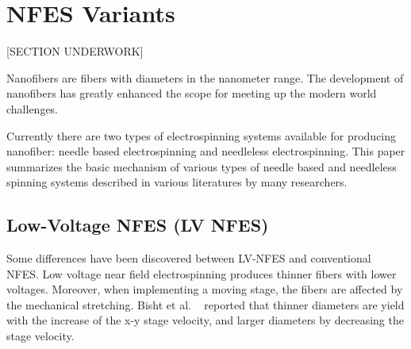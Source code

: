 \documentclass[5p,,preprint,12pt,twocolumn]{elsarticle}
\makeatletter
\def\fixFloatSize#1{}%
\makeatother
\begin{document}
\section{NFES Variants}
[SECTION UNDERWORK]

Nanofibers are fibers with diameters in the nanometer range. The development of nanofibers has greatly enhanced the scope for meeting up the modern world challenges. 

Currently there are two types of electrospinning systems available for producing nanofiber: needle based electrospinning and needleless electrospinning. This paper summarizes the basic mechanism of various types of needle based and needleless spinning systems described in various literatures by many researchers.


\bgroup
\fixFloatSize{images/69d16de4-c7d7-4000-b4c8-93a40c79692b-uelectrospinningvariants.jpg}
\begin{figure}[!htbp]
\centering \makeatletter{}
\makeatother 
\caption{{}}
\label{f-f076e2b74317}
\end{figure}
\egroup




\subsection{Low-Voltage NFES (LV NFES) \unskip~\protect\cite{527120:11973130}}Some differences have been discovered between LV-NFES and conventional NFES. Low voltage near field electrospinning produces thinner fibers with lower voltages. Moreover, when implementing a moving stage, the fibers are affected by the mechanical stretching. Bisht et al. \unskip~\cite{527120:11973130} reported that thinner diameters are yield with the increase of the x-y stage velocity, and larger diameters by decreasing the stage velocity.
\end{document}
